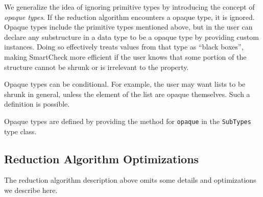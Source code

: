\documentclass{sigplanconf}
\newcommand{\ttp}[1]{\texttt{#1}}
\begin{document}
We generalize the idea of ignoring primitive types by introducing the concept of
\emph{opaque types}.  If the reduction algorithm encounters a opaque type, it is
ignored.  Opaque types include the primitive types mentioned above, but in the
user can declare any substructure in a data type to be a opaque type by
providing custom instances.  Doing so effectively treats values from that type
as ``black boxes'', making SmartCheck more efficient if the user knows that some
portion of the structure cannot be shrunk or is irrelevant to the property.

Opaque types can be conditional.  For example, the user may want lists to be
shrunk in general, unless the element of the list are opaque themselves.  Such a
definition is possible.

Opaque types are defined by providing the method for \ttp{opaque} in the
\ttp{SubTypes} type class.







\subsection{Reduction Algorithm Optimizations}\label{sec:optimizations}
The reduction algorithm description above omits some details and optimizations
we describe here.
\end{document}
